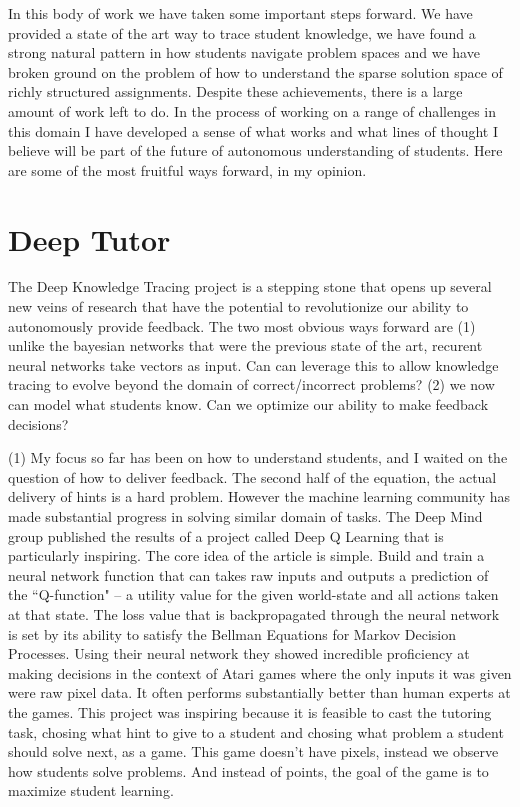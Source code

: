 In this body of work we have taken some important steps forward. We have provided a state of the art way to trace student knowledge, we have found a strong natural pattern in how students navigate problem spaces and we have broken ground on the problem of how to understand the sparse solution space of richly structured assignments. Despite these achievements, there is a large amount of work left to do. In the process of working on a range of challenges in this domain I have developed a sense of what works and what lines of thought I believe will be part of the future of autonomous understanding of students. Here are some of the most fruitful ways forward, in my opinion. 


\section{Deep Tutor}

The Deep Knowledge Tracing project is a stepping stone that opens up several new veins of research that have the potential to revolutionize our ability to autonomously provide feedback. The two most obvious ways forward are (1) unlike the bayesian networks that were the previous state of the art, recurent neural networks take vectors as input. Can can leverage this to allow knowledge tracing to evolve beyond the domain of correct/incorrect problems? (2) we now can model what students know. Can we optimize our ability to make feedback decisions?

(1) My focus so far has been on how to understand students, and I waited on the question of how to deliver feedback. The second half of the equation, the actual delivery of hints is a hard problem. However the machine learning community has made substantial progress in solving similar domain of tasks. The Deep Mind group published the results of a project called Deep Q Learning \cite{mnih2015human} that is particularly inspiring. The core idea of the article is simple. Build and train a neural network function that can takes raw inputs and outputs a prediction of the ``Q-function" -- a utility value for the given world-state and all actions taken at that state. The loss value that is backpropagated through the neural network is set by its ability to satisfy the Bellman Equations for Markov Decision Processes. Using their neural network they showed incredible proficiency at making decisions in the context of Atari games where the only inputs it was given were raw pixel data. It often performs substantially better than human experts at the games. This project was inspiring because it is feasible to cast the tutoring task, chosing what hint to give to a student and chosing what problem a student should solve next, as a game. This game doesn't have pixels, instead we observe how students solve problems. And instead of points, the goal of the game is to maximize student learning.

